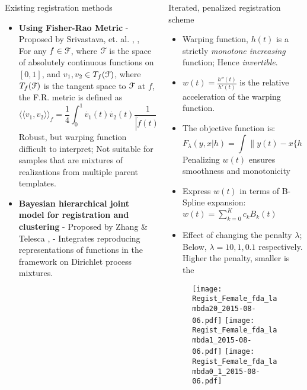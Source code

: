 \documentclass[final]{beamer}
\newlength{\onecolwid}
\begin{document}
\begin{frame}{}
\begin{columns}[t]
\begin{column}{\onecolwid}
\begin{block}{Existing registration methods}
\begin{itemize}
          \item {\bf{Using Fisher-Rao Metric}} - Proposed by Srivastava, et. al. \cite{Srivastava_etal_2011_v2_arXiv}, \cite{Wu_Srivastava_2014_EJS}, \cite{R-fdasrvf} \\
            For any $f \in \mathcal{F}$, where $\mathcal{F}$ is the space of absolutely continuous functions on $[0,1]$, and $v_1, v_2 \in T_f(\mathcal{F})$, where $T_f(\mathcal{F})$ is the tangent space to $\mathcal{F}$ at $f$, the F.R. metric is defined as $$\langle \langle v_1, v_2 \rangle \rangle_f = \frac{1}{4}\int_0^1\dot{v_1}(t) \dot{v_2}(t)\frac{1}{|\dot{f}(t)|}dt$$
            Robust, but warping function difficult to interpret; Not suitable for samples that are mixtures of realizations from multiple parent templates.
          \item {\bf{Bayesian hierarchical joint model for registration and clustering}} - Proposed by Zhang \& Telesca \cite{Zhang_Telesca_2014_arXiv}, \cite{Zhang_2014_PhDThesis} - Integrates reproducing representations of functions in the framework on Dirichlet process mixtures.
            
        \end{itemize}
      \end{block}
    \end{column}

    \begin{column}{\onecolwid}\vspace{-1in}
      \begin{block}{Iterated, penalized registration scheme}
        \begin{itemize}
        \item Warping function, $h(t)$ is a strictly {\emph{monotone increasing}} function; Hence {\emph{invertible}}.
        \item $w(t) = \frac{h''(t)}{h'(t)}$ is the relative acceleration of the warping function. 
        \item The objective function is:
          \[ F_{\lambda}(y,x|h) = \int \|y(t) - x\{h(t)\} \|^2 dt + \lambda \int w^2(t) dt \]
          Penalizing $w(t)$ ensures smoothness and monotonicity
        \item Express $w(t)$ in terms of B-Spline expansion: 
          $w(t) = \sum \limits_{k=0}^{K} c_k B_k(t)$
        \item Effect of changing the penalty $\lambda$; Below, $\lambda = 10, 1, 0.1$ respectively. Higher the penalty, smaller is the 
        \end{itemize}
        \begin{figure}
          \texttt{[image: Regist\_Female\_fda\_lambda20\_2015-08-06.pdf]}
          \texttt{[image: Regist\_Female\_fda\_lambda1\_2015-08-06.pdf]}
          \texttt{[image: Regist\_Female\_fda\_lambda0\_1\_2015-08-06.pdf]} \\


\end{figure}
\end{block}
\end{column}
\end{columns}
\end{frame}
\end{document}
